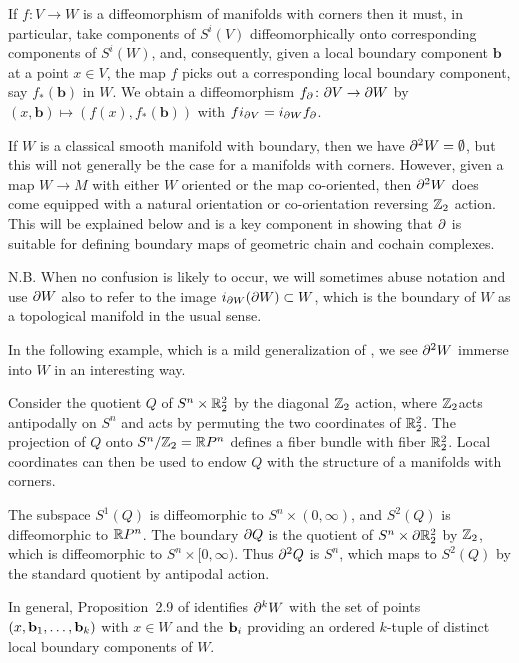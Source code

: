 \begin{remark}\label{R: bd diff}
	If $f \colon V \to W$ is a diffeomorphism of manifolds with corners then it must, in particular, take components of $S^i(V)$ diffeomorphically onto corresponding components of $S^i(W)$, and, consequently, given a local boundary component $\mathbf{b}$ at a point $x \in V$, the map $f$ picks out a corresponding local boundary component, say $f_*(\mathbf{b})$ in $W$. We obtain a diffeomorphism $f_\partial \colon \partial V \to \partial W$ by $(x,\mathbf{b})\mapsto (f(x),f_*(\mathbf{b}))$ with $fi_{\partial V} = i_{\partial W} f_\partial$.
\end{remark}

If $W$ is a classical smooth manifold with boundary, then we have $\partial^2 W=\emptyset$, but this will not generally be the case for a manifolds with corners.
However, given a map $W \to M$ with either $W$ oriented or the map co-oriented, then $\partial^2 W$ does come equipped with a natural orientation or co-orientation reversing $\mathbb{Z}_2$ action.
This will be explained below and is a key component in showing that $\partial$ is suitable for defining boundary maps of geometric chain and cochain complexes.

N.B. When no confusion is likely to occur, we will sometimes abuse notation and use $\partial W$ also to refer to the image $i_{\partial W}(\partial W) \subset W$, which is the boundary of $W$ as a topological manifold in the usual sense.

In the following example, which is a mild generalization of \cite[Example 7.3]{Joy12}, we see $\partial^2 W$ immerse into $W$ in an interesting way.

\begin{example}\label{boundary}
	Consider the quotient $Q$ of $S^n \times \mathbb{R}^2_2$ by the diagonal $\mathbb{Z}_2$ action, where $\mathbb{Z}_2$acts antipodally on $S^n$ and acts by permuting the two coordinates
	of $\mathbb{R}^2_2$.
	The projection of $Q$ onto $S^n / \mathbb{Z}_2 = \mathbb{R} P^n$ defines a fiber bundle with fiber $\mathbb{R}^2_2$.
	Local coordinates can then be used to endow $Q$ with the structure of a manifolds with corners.

	The subspace $S^1(Q)$ is diffeomorphic to $S^n \times (0,\infty)$, and $S^2(Q)$ is diffeomorphic to $\mathbb{R} P^n$.
	The boundary $\partial Q$ is the quotient of $S^n \times \partial \mathbb{R}^2_2$ by $\mathbb{Z}_2$, which is diffeomorphic to
	$S^n \times [0,\infty)$.
	Thus $\partial^2 Q$ is $S^n$, which maps to $S^2(Q)$ by the standard quotient by antipodal action.
\end{example}

In general, Proposition~2.9 of \cite{Joy12} identifies $\partial^k W$ with the set of points $(x,\mathbf{b}_1,\ldots,\mathbf{b}_k)$ with $x \in W$ and the $\mathbf{b}_i$ providing an ordered $k$-tuple of distinct local boundary components of $W$.

